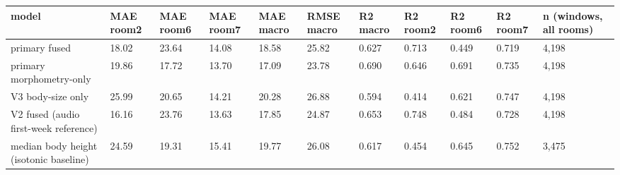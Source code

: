 \begin{tabular}{lllllllllll}
\hline
model & MAE room2 & MAE room6 & MAE room7 & MAE macro & RMSE macro & R2 macro & R2 room2 & R2 room6 & R2 room7 & n (windows, all rooms) \\
\hline
primary fused & 18.02 & 23.64 & 14.08 & 18.58 & 25.82 & 0.627 & 0.713 & 0.449 & 0.719 & 4,198 \\
primary morphometry-only & 19.86 & 17.72 & 13.70 & 17.09 & 23.78 & 0.690 & 0.646 & 0.691 & 0.735 & 4,198 \\
V3 body-size only & 25.99 & 20.65 & 14.21 & 20.28 & 26.88 & 0.594 & 0.414 & 0.621 & 0.747 & 4,198 \\
V2 fused (audio first-week reference) & 16.16 & 23.76 & 13.63 & 17.85 & 24.87 & 0.653 & 0.748 & 0.484 & 0.728 & 4,198 \\
median body height (isotonic baseline) & 24.59 & 19.31 & 15.41 & 19.77 & 26.08 & 0.617 & 0.454 & 0.645 & 0.752 & 3,475 \\
\hline
\end{tabular}
